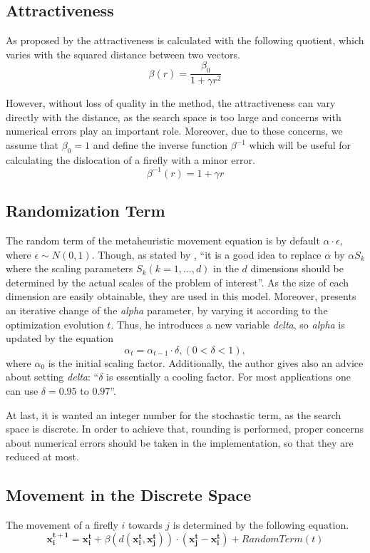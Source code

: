 \documentclass[tuberlin,cic,tc,openright,english,noabntcite,oneside]{iiufrgs}
\begin{document}
\subsection{Attractiveness}\label{sec:attractiveness}
As proposed by \textcite[p. 173]{yang_firefly_2009} the attractiveness is calculated with the following quotient, which varies with the squared distance between two vectors.
$$\beta(r) = \frac{\beta_{0}}{1 + \gamma r^2}$$

However, without loss of quality in the method, the attractiveness can vary directly with the distance, as the search space is too large and concerns with numerical errors play an important role. Moreover, due to these concerns, we assume that $\beta_0 = 1$ and define the inverse function $\beta^{-1}$ which will be useful for calculating the dislocation of a firefly with a minor error.
$$\beta^{-1}(r) = 1 + \gamma r$$

\subsection{Randomization Term}\label{sec:random_term}
The random term of the metaheuristic movement equation is by default $\alpha \cdot \epsilon$, where $\epsilon \sim N(0,1)$. Though, as stated by \textcite[p. 80]{yang_firefly_2010}, \enquote{it is a good idea to replace $\alpha$ by $\alpha S_k$ where the scaling parameters $S_k (k=1,...,d)$ in the $d$ dimensions should be determined by the actual scales of the problem of interest}. As the size of each dimension are easily obtainable, they are used in this model. Moreover, \textcite[p. 37-38]{yang_firefly_2013} presents an iterative change of the \emph{alpha} parameter, by varying it according to the optimization evolution $t$. Thus, he introduces a new variable \emph{delta}, so \emph{alpha} is updated by the equation
$$ \alpha_t = \alpha_{t-1} \cdot \delta, (0 < \delta < 1),$$ where $\alpha_0$ is the initial scaling factor. Additionally, the author gives also an advice about setting \emph{delta}: \enquote{$\delta$ is essentially a cooling factor. For most applications one can use $\delta = 0.95$ to $0.97$}.

At last, it is wanted an integer number for the stochastic term, as the search space is discrete. In order to achieve that, rounding is performed, proper concerns about numerical errors should be taken in the implementation, so that they are reduced at most.

\subsection{Movement in the Discrete Space}
The movement of a firefly $i$ towards $j$ is determined by the following equation.
$$\mathbf{x^{t+1}_i} = \mathbf{x^{t}_i} + \beta(d(\mathbf{x^{t}_i}, \mathbf{x^{t}_j})) \cdot (\mathbf{x^{t}_j} - \mathbf{x^{t}_i}) + RandomTerm(t)$$
\end{document}
